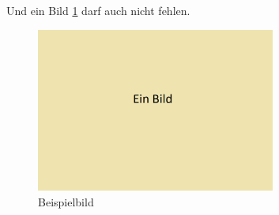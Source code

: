 Und ein Bild \ref{img:Beispielbild} darf auch nicht fehlen.

\begin{figure}[H]
    \centering
    \includegraphics[width=0.7\textwidth]{images/Beispielbild.png}
    \caption{Beispielbild}
    \label{img:Beispielbild}
\end{figure}